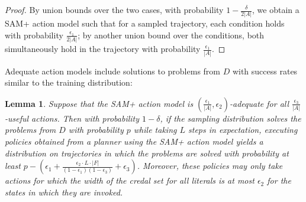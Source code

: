 \documentclass[letterpaper]{article} %
\newtheorem{lemma}{Lemma}
\begin{document}
\begin{proof}
By union bounds over the two cases, with probability $1-\frac{\delta}{2|A|}$, we obtain a SAM+ action model such that for a sampled trajectory, each condition holds with probability $\frac{\epsilon_1}{2|A|}$; by another union bound over the conditions, both simultaneously hold in the trajectory with probability $\frac{\epsilon_1}{|A|}$.
\end{proof}

\noindent
Adequate action models include solutions to problems from $D$ with success rates similar to the training distribution:

\begin{lemma}\label{lem:sam-success}
Suppose that the SAM+ action model is $(\frac{\epsilon_1}{|A|},\epsilon_2)$-adequate for all $\frac{\epsilon_3}{|A|}$-useful actions. Then with probability $1-\delta$, if the sampling distribution solves the problems from $D$ with probability $p$ while taking $L$ steps in expectation, executing policies obtained from a planner using the SAM+ action model yields a distribution on trajectories in which the problems are solved with probability at least $p-(\epsilon_1+\frac{\epsilon_2\cdot L\cdot |F|}{(1-\epsilon_1)(1-\epsilon_3)}+\epsilon_3)$.
Moreover, these policies may only take actions for which the width of the credal set for all literals is at most $\epsilon_2$ for the states in which they are invoked.
\end{lemma}
\end{document}
